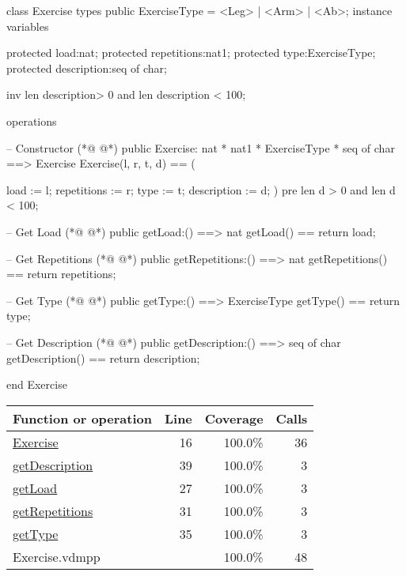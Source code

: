 \begin{vdmpp}[breaklines=true]
class Exercise
types
 public ExerciseType = <Leg> | <Arm> | <Ab>;
instance variables
 
 protected load:nat;
 protected repetitions:nat1;
 protected type:ExerciseType;
 protected description:seq of char;
 
 inv len description> 0 and len description < 100;
 
operations
 
 -- Constructor
(*@
\label{Exercise:16}
@*)
 public Exercise: nat * nat1 * ExerciseType * seq of char ==> Exercise
 Exercise(l, r, t, d) == (
  
  load := l;
  repetitions := r;
  type := t;
  description := d;
 )
 pre len d > 0 and len d < 100;
 
  -- Get Load
(*@
\label{getLoad:27}
@*)
  public getLoad:() ==> nat
  getLoad() == return load;
  
  -- Get Repetitions
(*@
\label{getRepetitions:31}
@*)
  public getRepetitions:() ==> nat
  getRepetitions() == return repetitions;
  
  -- Get Type
(*@
\label{getType:35}
@*)
  public getType:() ==> ExerciseType
  getType() == return type;
  
  -- Get Description
(*@
\label{getDescription:39}
@*)
  public getDescription:() ==> seq of char
  getDescription() == return description;
  
end Exercise
\end{vdmpp}
\bigskip
\begin{longtable}{|l|r|r|r|}
\hline
Function or operation & Line & Coverage & Calls \\
\hline
\hline
\hyperref[Exercise:16]{Exercise} & 16&100.0\% & 36 \\
\hline
\hyperref[getDescription:39]{getDescription} & 39&100.0\% & 3 \\
\hline
\hyperref[getLoad:27]{getLoad} & 27&100.0\% & 3 \\
\hline
\hyperref[getRepetitions:31]{getRepetitions} & 31&100.0\% & 3 \\
\hline
\hyperref[getType:35]{getType} & 35&100.0\% & 3 \\
\hline
\hline
Exercise.vdmpp & & 100.0\% & 48 \\
\hline
\end{longtable}

